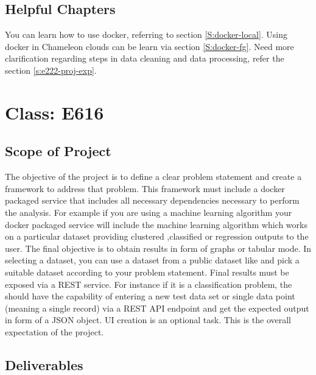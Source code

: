 \subsection{Helpful Chapters}

You can learn how to use docker, referring to section
\ref{S:docker-local}.  Using docker in Chameleon clouds can be learn
via section \ref{S:docker-fg}.  Need more clarification regarding
steps in data cleaning and data processing, refer the section
\ref{s:e222-proj-exp}.


\section{Class: E616}\label{s:e616-project}

\subsection{Scope of Project}

The objective of the project is to define a clear problem statement
and create a framework to address that problem. This framework must
include a docker packaged service that includes all necessary
dependencies necessary to perform the analysis. For example if you are using a
machine learning algorithm your docker packaged service will include the
machine learning algorithm which works on a particular dataset
providing clustered ,classified or regression outputs to the user. The
final objective is to obtain results in form of graphs or tabular
mode. In selecting a dataset, you can use a dataset from a public
dataset like  and
pick a suitable dataset according to your problem statement. Final
results must be exposed via a REST service. For instance if it is a
classification problem, the should have the capability of entering a
new test data set or single data point (meaning a single record) via a
REST API endpoint and get the expected output in form of a JSON
object. UI creation is an optional task. This is the overall
expectation of the project. 

\subsection{Deliverables}

